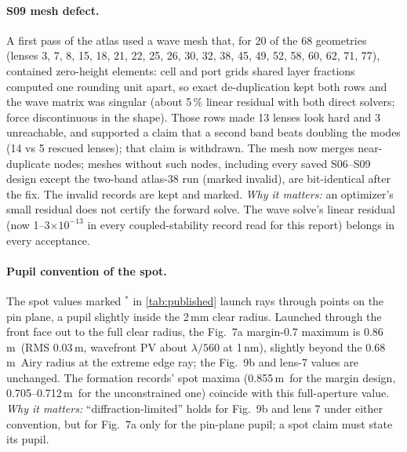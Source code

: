 \documentclass[11pt,a4paper]{article}
\numberwithin{equation}{section}
\newcommand{\um}{\,\textmu m}
\begin{document}
\paragraph{S09 mesh defect.}\label{sec:mesh} A first pass of the atlas used a wave
mesh that, for 20 of the 68 geometries (lenses 3, 7, 8, 15, 18, 21, 22, 25, 26,
30, 32, 38, 45, 49, 52, 58, 60, 62, 71, 77), contained zero-height elements: cell
and port grids shared layer fractions computed one rounding unit apart, so exact
de-duplication kept both rows and the wave matrix was singular (about 5\,\% linear
residual with both direct solvers; force discontinuous in the shape). Those rows
made 13 lenses look hard and 3 unreachable, and supported a claim that a second
band beats doubling the modes (14 vs 5 rescued lenses); that claim is withdrawn.
The mesh now merges near-duplicate nodes; meshes without such nodes, including
every saved S06--S09 design except the two-band atlas-38 run (marked invalid),
are bit-identical after the fix. The invalid records are kept and marked.
\emph{Why it matters:} an optimizer's small residual does not certify the forward
solve. The wave solve's linear residual (now 1--3$\times10^{-13}$ in every coupled-stability record
read for this report) belongs in every acceptance.

\paragraph{Pupil convention of the spot.} The spot values marked $^\ast$ in
\cref{tab:published} launch rays through points on the pin plane, a pupil slightly
inside the 2\,mm clear radius. Launched through the front face out to the full
clear radius, the Fig.~7a margin-0.7 maximum is 0.86\um\ (RMS 0.03\um, wavefront
PV about $\lambda/560$ at 1\,nm), slightly beyond the 0.68\um\ Airy radius at the
extreme edge ray; the Fig.~9b and lens-7 values are unchanged. The formation
records' spot maxima (0.855\um\ for the margin design, 0.705--0.712\um\ for the
unconstrained one) coincide with this full-aperture value. \emph{Why it matters:}
\enquote{diffraction-limited} holds for Fig.~9b and lens 7 under either
convention, but for Fig.~7a only for the pin-plane pupil; a spot claim must state
its pupil.
\end{document}
